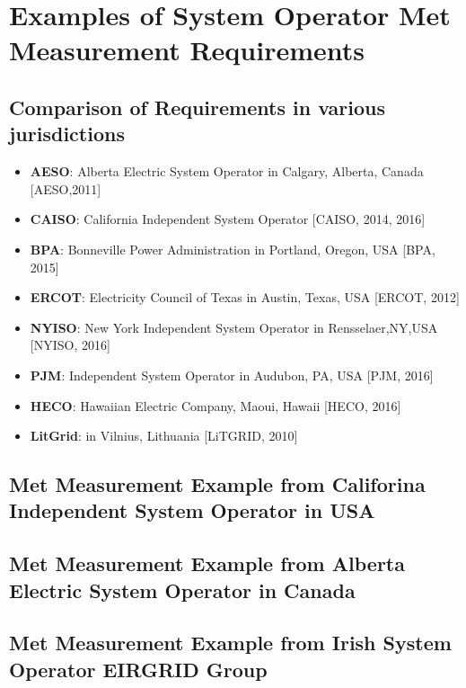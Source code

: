 \chapter{Examples of System Operator Met Measurement Requirements}\label{ch:requiremenexamples}


\section{Comparison of Requirements in various jurisdictions}

\begin{itemize}
    \item \textbf{AESO}: Alberta Electric System Operator in Calgary, Alberta, Canada [AESO,2011]
    \item \textbf{CAISO}: California Independent System Operator [CAISO, 2014, 2016]
    \item \textbf{BPA}: Bonneville Power Administration in Portland, Oregon, USA [BPA, 2015]
    \item \textbf{ERCOT}: Electricity Council of Texas in Austin, Texas, USA [ERCOT, 2012]
    \item \textbf{NYISO}: New York Independent System Operator in Rensselaer,NY,USA [NYISO, 2016] 
    \item \textbf{PJM}: Independent System Operator in Audubon, PA, USA [PJM, 2016]
    \item \textbf{HECO}: Hawaiian Electric Company, Maoui, Hawaii [HECO, 2016]
    \item \textbf{LitGrid}: in Vilnius, Lithuania [LiTGRID, 2010]
\end{itemize}


\section{Met Measurement Example from Califorina Independent System Operator in USA}

\section{Met Measurement Example from Alberta Electric System Operator in Canada}

\section{Met Measurement Example from Irish System Operator EIRGRID Group}

